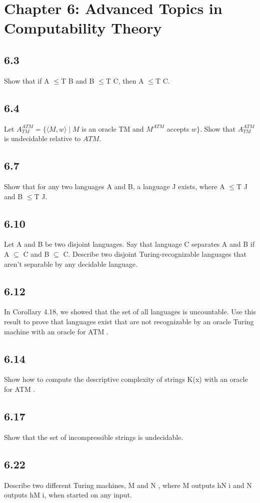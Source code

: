 \section*{Chapter 6: Advanced Topics in Computability Theory}

\subsection*{6.3}

Show that if A $\le$T B and B $\le$T C, then A $\le$T C.


\subsection*{6.4}

Let $A_{TM}^{ATM} = \{\langle M, w\rangle \mid M$ is an oracle TM and $M^{ATM}$ accepts $w\}$. Show that $A_{TM}^{ATM}$ is undecidable relative to $ATM$.


\subsection*{6.7}

Show that for any two languages A and B, a language J exists, where A $\le$T J and B $\le$T J.


\subsection*{6.10}

Let A and B be two disjoint languages. Say that language C separates A and B if A $\subseteq$ C and B $\subseteq$ C. Describe two disjoint Turing-recognizable languages that aren't separable by any decidable language.


\subsection*{6.12}

In Corollary 4.18, we showed that the set of all languages is uncountable. Use this result to prove that languages exist that are not recognizable by an oracle Turing machine with an oracle for ATM .


\subsection*{6.14}

Show how to compute the descriptive complexity of strings K(x) with an oracle for ATM .


\subsection*{6.17}

Show that the set of incompressible strings is undecidable.


\subsection*{6.22}

Describe two different Turing machines, M and N , where M outputs hN i and N outputs hM i, when started on any input.


\clearpage
